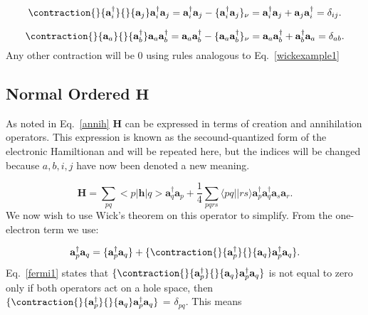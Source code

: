 \documentclass[graybox,sectrefs,envcountresetchap,open=right]{svmonodo}
\begin{document}
\begin{equation}
\contraction{}{\mathbf{a}^{\dagger}_i}{}{\mathbf{a}_j}
\mathbf{a}^{\dagger}_i \mathbf{a}_j
 = \mathbf{a}^{\dagger}_i \mathbf{a}_j
 - \{\mathbf{a}^{\dagger}_i \mathbf{a}_j \}_{\nu} = \mathbf{a}^{\dagger}_i \mathbf{a}_j
 +  \mathbf{a}_j \mathbf{a}^{\dagger}_i = \delta_{ij} . \label{fermi1}
\end{equation} 

\begin{equation}
\contraction{}{\mathbf{a}_a}{}{\mathbf{a}^{\dagger}_b}
\mathbf{a}_a \mathbf{a}^{\dagger}_b = \mathbf{a}_a \mathbf{a}^{\dagger}_b - \{\mathbf{a}_a \mathbf{a}^{\dagger}_b\}_{\nu} = \mathbf{a}_a \mathbf{a}^{\dagger}_b + \mathbf{a}^{\dagger}_b \mathbf{a}_a = \delta_{ab} . \label{fermi2}
\end{equation} 
Any other contraction will be 0 using rules analogous to Eq.~\ref{wickexample1}

\subsection{Normal Ordered $\mathbf{H}$}
As noted in Eq.~\ref{annih} $\mathbf{H}$ can be expressed in terms of creation and annihilation operators. This expression is known as the secound-quantized form of the electronic Hamiltionan and will be repeated here, but the indices will be changed because $a,b,i,j$ have now been denoted a new meaning.

\begin{equation}
\mathbf{H} = \sum_{pq} <p|\mathbf{h}|q> \mathbf{a}^{\dagger}_q \mathbf{a}_p + 
\frac{1}{4} \sum_{pqrs} \langle pq||rs \rangle \mathbf{a}^{\dagger}_p \mathbf{a}^{\dagger}_q \mathbf{a}_s \mathbf{a}_r .
\end{equation} 
We now wish to use Wick's theorem on this operator to simplify. From the one-electron term we use:

\begin{equation}
\mathbf{a}^{\dagger}_p \mathbf{a}_q = \{\mathbf{a}^{\dagger}_p \mathbf{a}_q \} + \{\contraction{}{\mathbf{a}^{\dagger}_p}{}{\mathbf{a}_q}
 \mathbf{a}^{\dagger}_p \mathbf{a}_q 
\} . 
\end{equation} 
Eq.~\ref{fermi1} states that $\{\contraction{}{\mathbf{a}^{\dagger}_p}{}{\mathbf{a}_q}
\mathbf{a}^{\dagger}_p \mathbf{a}_q \}$ is not equal to zero only if both operators act on a hole space, then $\{\contraction{}{\mathbf{a}^{\dagger}_p}{}{\mathbf{a}_q}
\mathbf{a}^{\dagger}_p \mathbf{a}_q \}$ = $\delta_{pq}$. This means 
\end{document}
